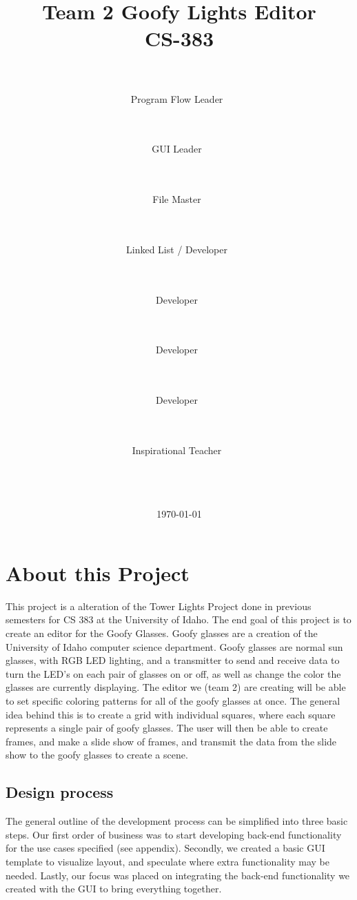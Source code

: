 \documentclass[11pt]{article} %
\title{
	{\Huge Team 2 Goofy Lights Editor}
	\\
	{\Large CS-383}}
\author{
	\\
	\makebox[.3\linewidth]{Nick Krenowicz}\\Program Flow Leader\ \and
	\\
	\makebox[.3\linewidth]{Paul Martin}\\GUI Leader\ \and
	\\
	\makebox[.3\linewidth]{Tim Sonnen}\\File Master\ \and
	\\
	\makebox[.3\linewidth]{Kevin Dorscher}\\Linked List / Developer\ \and
	\\
	\makebox[.3\linewidth]{Joe Carter}\\Developer\ \and
	\\
	\makebox[.3\linewidth]{Lise Welch}\\Developer\ \and
	\\
	\makebox[.3\linewidth]{Emma Bateman}\\Developer\ \and
	\\
	\makebox[.3\linewidth]{Bruce Bolden}\\Inspirational Teacher\ %
	\\
	\\
	\\
	\\}
\date{\today} %
\begin{document}
\lstset{language=C++}
\maketitle
\pagebreak

\tableofcontents
\newpage %


\section{About this Project}
This project is a alteration of the Tower Lights Project done in previous semesters for CS 383 at the University of Idaho. The end goal of this project is to create an editor for the Goofy Glasses. Goofy glasses are a creation of the University of Idaho computer science department. Goofy glasses are normal sun glasses, with RGB LED lighting, and a transmitter to send and receive data to turn the LED's on each pair of glasses on or off, as well as change the color the glasses are currently displaying. The editor we (team 2) are creating will be able to set specific coloring patterns for all of the goofy glasses at once. The general idea behind this is to create a grid with individual squares, where each square represents a single pair of goofy glasses. The user will then be able to create frames, and make a slide show of frames, and transmit the data from the slide show to the goofy glasses to create a scene. 

\subsection{Design process}
The general outline of the development process can be simplified into three basic steps. Our first order of business was to start developing back-end functionality for the use cases specified (see appendix). Secondly, we created a basic GUI template to visualize layout, and speculate where extra functionality may be needed. Lastly, our focus was placed on integrating the back-end functionality we created with the GUI to bring everything together.
\end{document}
